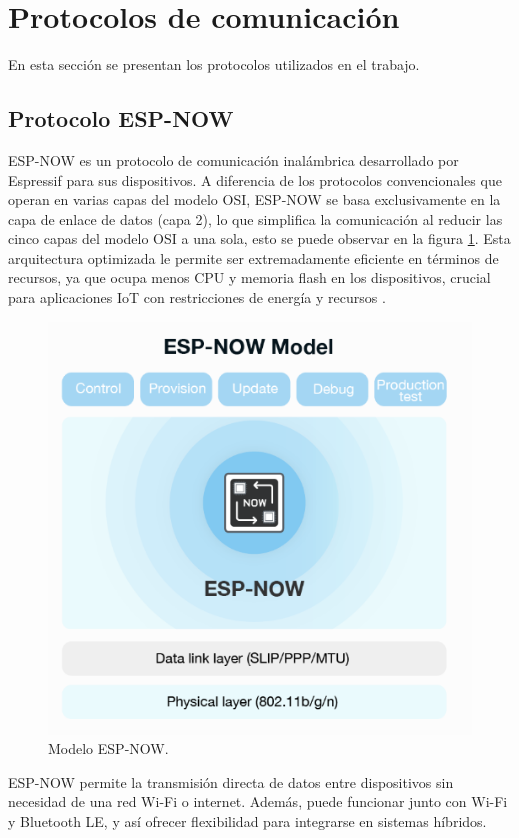 \section{Protocolos de comunicación}

En esta sección se presentan los protocolos utilizados en el trabajo.

\subsection{Protocolo ESP-NOW}

ESP-NOW es un protocolo de comunicación inalámbrica desarrollado por Espressif para sus dispositivos. A diferencia de los protocolos convencionales que operan en varias capas del modelo OSI, ESP-NOW se basa exclusivamente en la capa de enlace de datos (capa 2), lo que simplifica la comunicación al reducir las cinco capas del modelo OSI a una sola, esto se puede observar en la figura \ref{fig:espnow}. Esta arquitectura optimizada le permite ser extremadamente eficiente en términos de recursos, ya que ocupa menos CPU y memoria flash en los dispositivos, crucial para aplicaciones IoT con restricciones de energía y recursos \citep{espnow}.

\begin{figure}[H]
    \centering
    \includegraphics[width=.6\textwidth]{./Figures/espnow.png}
    \caption{Modelo ESP-NOW.}
    \label{fig:espnow}
\end{figure}

ESP-NOW permite la transmisión directa de datos entre dispositivos sin necesidad de una red Wi-Fi o internet. Además, puede funcionar junto con Wi-Fi y Bluetooth LE, y así ofrecer flexibilidad para integrarse en sistemas híbridos.

